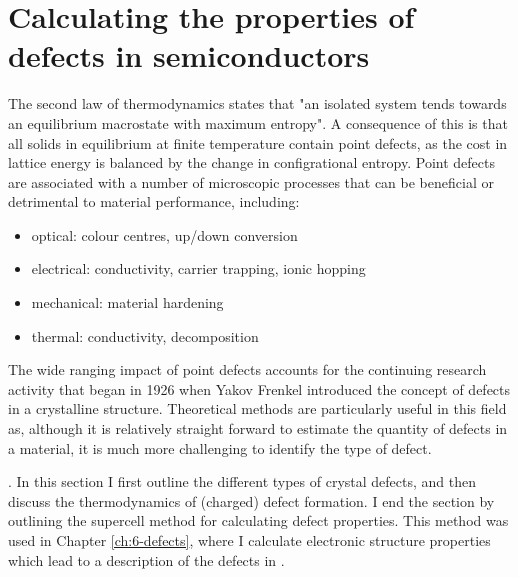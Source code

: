 \clearpage

\section{Calculating the properties of defects in semiconductors}

The second law of thermodynamics states that "an isolated system tends towards an equilibrium macrostate with maximum entropy". A consequence of this is that all solids in equilibrium at finite temperature contain point defects, as the cost in lattice energy is balanced by the change in configrational entropy. 
Point defects are associated with a number of microscopic processes that can be beneficial or detrimental to material performance, including:
\begin{itemize}
    \item optical: colour centres, up/down conversion
    \item electrical: conductivity, carrier trapping, ionic hopping
    \item mechanical: material hardening
    \item thermal: conductivity, decomposition
\end{itemize}
The wide ranging impact of point defects accounts for the continuing research activity that began in 1926 when Yakov Frenkel introduced the concept of defects in a crystalline structure. Theoretical methods are particularly useful in this field as, although it is relatively straight forward to estimate the quantity of defects in a material, it is much more challenging to identify the type of defect.  
 
. In this section I first outline the different types of crystal defects, and then discuss the thermodynamics of (charged) defect formation. I end the section by outlining the supercell method for calculating defect properties. This method was used in Chapter \ref{ch:6-defects}, where I calculate electronic structure properties which lead to a description of the defects in .



